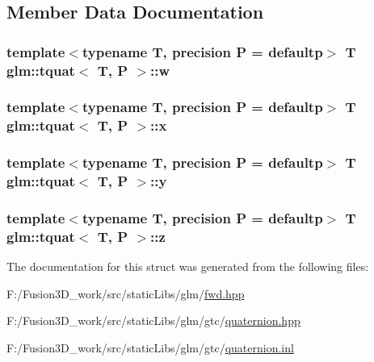 \subsection{Member Data Documentation}
\hypertarget{structglm_1_1tquat_a91055a4c17113bd3f357ffd8595d8ac0}{}
\subsubsection[{w}]{\setlength{\rightskip}{0pt plus 5cm}template$<$typename T, precision P = defaultp$>$ T {\bf glm\+::tquat}$<$ T, P $>$\+::w}\label{structglm_1_1tquat_a91055a4c17113bd3f357ffd8595d8ac0}
\hypertarget{structglm_1_1tquat_a4e7a21e85428fa8d10e613f109185f28}{}
\subsubsection[{x}]{\setlength{\rightskip}{0pt plus 5cm}template$<$typename T, precision P = defaultp$>$ T {\bf glm\+::tquat}$<$ T, P $>$\+::x}\label{structglm_1_1tquat_a4e7a21e85428fa8d10e613f109185f28}
\hypertarget{structglm_1_1tquat_a06d5c5fb3b08ec993fb4dd74b22fc011}{}
\subsubsection[{y}]{\setlength{\rightskip}{0pt plus 5cm}template$<$typename T, precision P = defaultp$>$ T {\bf glm\+::tquat}$<$ T, P $>$\+::y}\label{structglm_1_1tquat_a06d5c5fb3b08ec993fb4dd74b22fc011}
\hypertarget{structglm_1_1tquat_a1b28678ac0e0b3ac2537059754df9fdf}{}
\subsubsection[{z}]{\setlength{\rightskip}{0pt plus 5cm}template$<$typename T, precision P = defaultp$>$ T {\bf glm\+::tquat}$<$ T, P $>$\+::z}\label{structglm_1_1tquat_a1b28678ac0e0b3ac2537059754df9fdf}


The documentation for this struct was generated from the following files\+:\begin{DoxyCompactItemize}
\item 
F\+:/\+Fusion3\+D\+\_\+work/src/static\+Libs/glm/\hyperlink{fwd_8hpp}{fwd.\+hpp}\item 
F\+:/\+Fusion3\+D\+\_\+work/src/static\+Libs/glm/gtc/\hyperlink{gtc_2quaternion_8hpp}{quaternion.\+hpp}\item 
F\+:/\+Fusion3\+D\+\_\+work/src/static\+Libs/glm/gtc/\hyperlink{gtc_2quaternion_8inl}{quaternion.\+inl}\end{DoxyCompactItemize}
